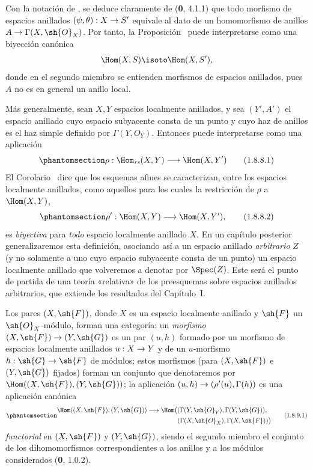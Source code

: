 \documentclass[oneside,10pt]{amsart}
\makeatletter
\newcommand{\ega@arrow}[2]{\mathchoice{#1}{#2}{#2}{#2}}
\renewcommand{\to}{\ega@arrow{\longrightarrow}{\rightarrow}}
\newcommand{\oldpage}[2][]{\marginnote{\normalfont\footnotesize\textbf{#1}~|~#2}\ignorespaces}
\let\EGAOriginalLabel\label
\renewcommand{\label}[1]{\phantomsection\EGAOriginalLabel{#1}}
\makeatother
\begin{document}
\begin{env}[1.8.8]
\label{ega2:addendum:I.1.8.8}
Con la notación de , se deduce claramente de
(\textbf 0, 4.1.1) que todo morfismo de espacios anillados
$(\psi,\theta):X\to S'$ equivale al dato de un homomorfismo de
anillos $A\to\Gamma(X,\sh{O}_X)$. Por tanto, la
Proposición~ puede interpretarse como una biyección
canónica
\[
  \Hom(X,S)\isoto\Hom(X,S'),
\]
donde en el segundo miembro se entienden morfismos de espacios
anillados, pues $A$ no es en general un anillo local.

Más generalmente, sean $X,Y$ espacios localmente anillados, y sea
$(Y',A')$ el espacio anillado cuyo espacio subyacente consta de un
punto y cuyo haz de anillos es el haz simple definido por
$\Gamma(Y,O_Y)$. Entonces  puede interpretarse
como una aplicación
\begin{equation}
\label{ega2:addendum:I.1.8.8.1}
  \rho:\Hom_{\mathit{rs}}(X,Y)\to\Hom(X,Y')
\tag{1.8.8.1}
\end{equation}
El Corolario~ dice que los esquemas afines se
caracterizan, entre los espacios localmente anillados, como aquellos
para los cuales la restricción de $\rho$ a $\Hom(X,Y)$,
\begin{equation}
\label{ega2:addendum:I.1.8.8.2}
  \rho':\Hom(X,Y)\to\Hom(X,Y'),
\tag{1.8.8.2}
\end{equation}
es \emph{biyectiva} para \emph{todo} espacio localmente anillado $X$. En un capítulo
posterior generalizaremos esta definición, asociando así a un espacio
anillado \emph{arbitrario} $Z$ (y no solamente a uno cuyo espacio subyacente
consta de un punto) un espacio localmente anillado que volveremos a
denotar por $\Spec(Z)$. Este será el punto de partida de una teoría
«relativa» de los preesquemas sobre espacios anillados arbitrarios,
que extiende los resultados del Capítulo~I.
\end{env}

\begin{env}[1.8.9]
\label{ega2:addendum:I.1.8.9}
Los pares $(X,\sh{F})$, donde $X$ es un espacio localmente anillado y
$\sh{F}$ un $\sh{O}_X$-módulo, forman una categoría: un \emph{morfismo}
$(X,\sh{F})\to(Y,\sh{G})$ es un par $(u,h)$ formado por un morfismo de
\oldpage[II]{221}
espacios localmente anillados $u:X\to Y$ y de un $u$-morfismo
$h:\sh{G}\to\sh{F}$ de módulos; estos
morfismos (para $(X,\sh{F})$ e $(Y,\sh{G})$ fijados) forman un conjunto
que denotaremos por $\Hom((X,\sh{F}),(Y,\sh{G}))$; la aplicación
$(u,h)\to(\rho'(u),\Gamma(h))$ es una aplicación canónica
\begin{equation}
\label{ega2:addendum:I.1.8.9.1}
\begin{split}
  \Hom((X,\sh{F}),(Y,\sh{G}))\to
  \Hom\bigl(
    &(\Gamma(Y,\sh{O}_Y),\Gamma(Y,\sh{G})),\\
    &(\Gamma(X,\sh{O}_X),\Gamma(X,\sh{F}))
  \bigr)
\end{split}
\tag{1.8.9.1}
\end{equation}
\emph{functorial} en $(X,\sh{F})$ y $(Y,\sh{G})$, siendo el segundo miembro
el conjunto de los dihomomorfismos correspondientes a los anillos y a
los módulos considerados (\textbf 0, 1.0.2).
\end{env}
\end{document}
